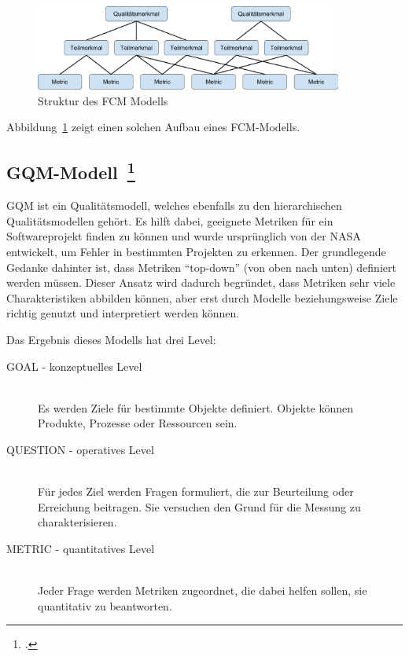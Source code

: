 \begin{savenotes}
  \begin{figure}[H] 
    \centering
    \includegraphics[width=0.9\textwidth]{img/fcm.png}
    \caption{Struktur des \ac{FCM} Modells}\label{fig:fcm}
  \end{figure}
\end{savenotes}

Abbildung~\ref{fig:fcm} zeigt einen solchen Aufbau eines \ac{FCM}-Modells.

\clearpage
\subsection[\ac{GQM}-Modell]{\acf{GQM}-Modell~\footcite[][]{basili_goal_nodate}}

\ac{GQM} ist ein Qualitätsmodell, welches ebenfalls zu den hierarchischen Qualitätsmodellen gehört.
Es hilft dabei, geeignete Metriken für ein Softwareprojekt finden zu können und wurde ursprünglich von der \ac{NASA} entwickelt, um Fehler in bestimmten Projekten zu erkennen.
Der grundlegende Gedanke dahinter ist, dass Metriken ``top\mbox{-}down'' (von oben nach unten) definiert werden müssen.
Dieser Ansatz wird dadurch begründet, dass Metriken sehr viele Charakteristiken abbilden können, aber erst durch Modelle beziehungsweise Ziele richtig genutzt und interpretiert werden können.

Das Ergebnis dieses Modells hat drei Level:
\begin{description}
  \item[GOAL \mbox{-} konzeptuelles Level] \hfill \\ Es werden Ziele für bestimmte Objekte definiert. Objekte können Produkte, Prozesse oder Ressourcen sein.
  \item[QUESTION \mbox{-} operatives Level] \hfill \\ Für jedes Ziel werden Fragen formuliert, die zur Beurteilung oder Erreichung beitragen. Sie versuchen den Grund für die Messung zu charakterisieren.
  \item[METRIC \mbox{-} quantitatives Level] \hfill \\ Jeder Frage werden Metriken zugeordnet, die dabei helfen sollen, sie quantitativ zu beantworten.
\end{description}

